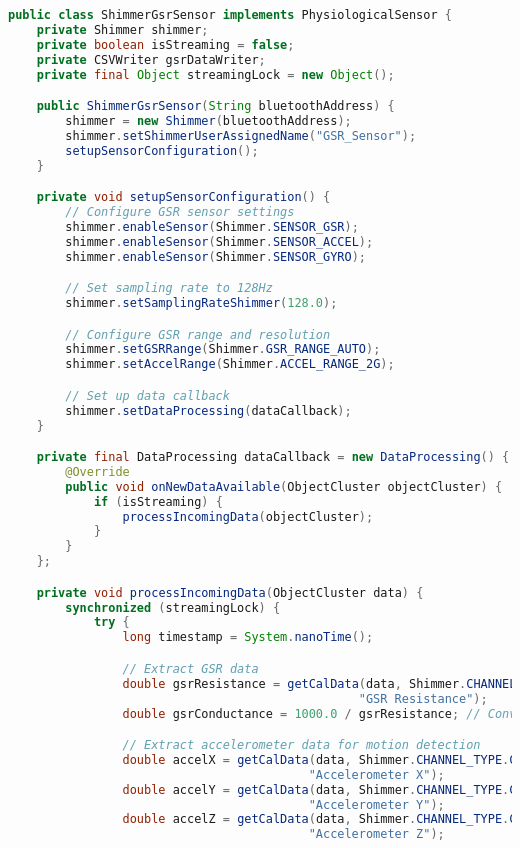 \begin{lstlisting}[language=Java, caption=Shimmer GSR Sensor Integration]
public class ShimmerGsrSensor implements PhysiologicalSensor {
    private Shimmer shimmer;
    private boolean isStreaming = false;
    private CSVWriter gsrDataWriter;
    private final Object streamingLock = new Object();

    public ShimmerGsrSensor(String bluetoothAddress) {
        shimmer = new Shimmer(bluetoothAddress);
        shimmer.setShimmerUserAssignedName("GSR_Sensor");
        setupSensorConfiguration();
    }

    private void setupSensorConfiguration() {
        // Configure GSR sensor settings
        shimmer.enableSensor(Shimmer.SENSOR_GSR);
        shimmer.enableSensor(Shimmer.SENSOR_ACCEL);
        shimmer.enableSensor(Shimmer.SENSOR_GYRO);

        // Set sampling rate to 128Hz
        shimmer.setSamplingRateShimmer(128.0);

        // Configure GSR range and resolution
        shimmer.setGSRRange(Shimmer.GSR_RANGE_AUTO);
        shimmer.setAccelRange(Shimmer.ACCEL_RANGE_2G);

        // Set up data callback
        shimmer.setDataProcessing(dataCallback);
    }

    private final DataProcessing dataCallback = new DataProcessing() {
        @Override
        public void onNewDataAvailable(ObjectCluster objectCluster) {
            if (isStreaming) {
                processIncomingData(objectCluster);
            }
        }
    };

    private void processIncomingData(ObjectCluster data) {
        synchronized (streamingLock) {
            try {
                long timestamp = System.nanoTime();

                // Extract GSR data
                double gsrResistance = getCalData(data, Shimmer.CHANNEL_TYPE.CAL.toString(),
                                                 "GSR Resistance");
                double gsrConductance = 1000.0 / gsrResistance; // Convert to μS

                // Extract accelerometer data for motion detection
                double accelX = getCalData(data, Shimmer.CHANNEL_TYPE.CAL.toString(),
                                          "Accelerometer X");
                double accelY = getCalData(data, Shimmer.CHANNEL_TYPE.CAL.toString(),
                                          "Accelerometer Y");
                double accelZ = getCalData(data, Shimmer.CHANNEL_TYPE.CAL.toString(),
                                          "Accelerometer Z");


\end{lstlisting}
